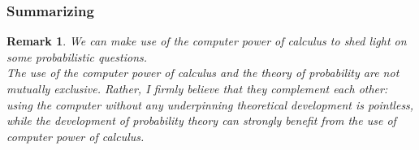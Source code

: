 \documentclass[notes=show,smaller,handout]{beamer}
\newtheorem{remark}{Remark}[section]
\begin{document}
\begin{frame}
\frametitle{Summarizing}

\begin{remark}
We can make use of the computer power of calculus to shed light on some probabilistic questions.\\ The use of the computer power of calculus and the theory of probability are not mutually exclusive. Rather, I firmly believe that they complement each other: using the computer without any underpinning theoretical development is pointless, while the development of probability theory can strongly benefit from the use of computer power of calculus. 
\end{remark}



\end{frame}
\end{document}
